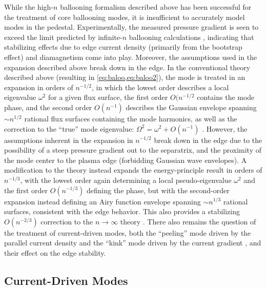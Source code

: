 While the high-$n$ ballooning formalism described above has been successful for the treatment of core ballooning modes, it is insufficient to accurately model modes in the pedestal.  Experimentally, the measured pressure gradient is seen to exceed the limit predicted by infinite-$n$ ballooning calculations \cite{Groebner1998a,Osborne1998}, indicating that stabilizing effects due to edge current density (primarily from the bootstrap effect) and diamagnetism come into play.  Moreover, the assumptions used in the expansion described above break down in the edge.  In the conventional theory \cite{Connor1978,Connor1979} described above (resulting in \cref{eq:baloo,eq:baloo2}), the mode is treated in an expansion in orders of $n^{-1/2}$, in which the lowest order describes a local eigenvalue $\omega^2$ for a given flux surface, the first order $O(n^{-1/2}$ contains the mode phase, and the second order $O(n^{-1})$ describes the Gaussian envelope spanning $\sim n^{1/2}$ rational flux surfaces containing the mode 
harmonics, as well as the correction to the ``true'' mode eigenvalue: $\Omega^2 = \omega^2 + O(n^{-1})$ \cite{Connor1998a,Wilson1999}.  However, the assumptions inherent in the expansion in $n^{-1/2}$ break down in the edge due to the possibility of a steep pressure gradient out to the separatrix, and the proximity of the mode center to the plasma edge (forbidding Gaussian wave envelopes).  A modification to the theory \cite{Connor1998a,Wilson1999} instead expands the energy-principle result in orders of $n^{-1/3}$, with the lowest order again determining a local pseudo-eigenvalue $\omega^2$ and the first order $O(n^{-1/3})$ defining the phase, but with the second-order expansion instead defining an Airy function envelope spanning $\sim n^{1/3}$ rational surfaces, consistent with the edge behavior.  This also provides a stabilizing $O(n^{-2/3})$ correction to the $n \rightarrow \infty$ theory \cite{Connor1998a}.  There also remains the question of the treatment of current-driven modes, both the ``peeling'' mode 
driven by the parallel current density and the ``kink'' mode driven by the current gradient \cite{Wilson2006}, and their effect on the edge stability.

\subsection{Current-Driven Modes}\label{subsec:mod_peel}

